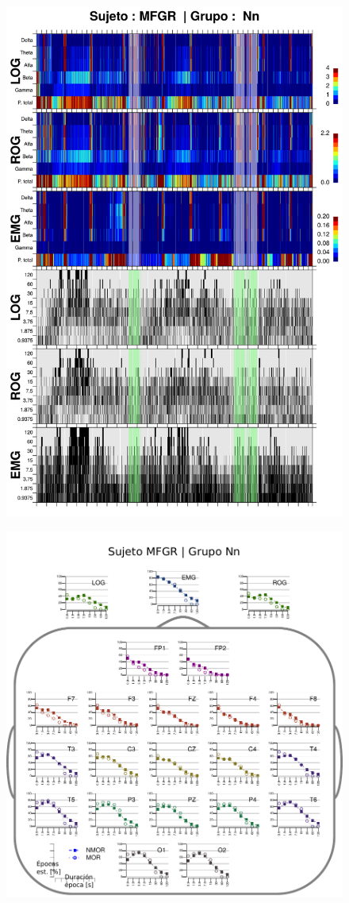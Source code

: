 \begin{figure}
\centering
\includegraphics[width=0.9\linewidth]
{./img_resultados/GURM251148SUE_combinado_.png} 
\end{figure}

\begin{figure}
\centering
\includegraphics[width=.9\linewidth]{./img_resultados/cabeza_MFGR.pdf}
\end{figure}

